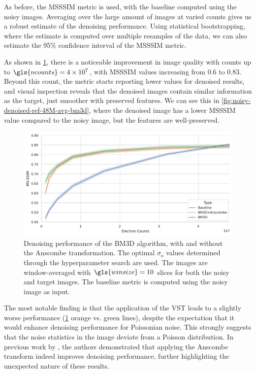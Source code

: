 As before, the \gls{MSSSIM} metric is used, with the baseline computed using the noisy images. Averaging over the large amount of images at varied counts gives us a robust estimate of the denoising performance. Using statistical bootstrapping, where the estimate is computed over multiple resamples of the data, we can also estimate the \num{95}\% confidence interval of the \gls{MSSSIM} metric.

As shown in \cref{fig:bm3d-msssim}, there is a noticeable improvement in image quality with counts up to $\gls{ncounts}=\num{4e7}$, with \gls{MSSSIM} values increasing from \num{0.6} to \num{0.83}. Beyond this count, the metric starts reporting lower values for denoised results, and visual inspection reveals that the denoised images contain similar information as the target, just smoother with preserved features. We can see this in \cref{fig:noisy-denoised-ref-48M-avg-bm3d}, where the denoised image has a lower \gls{MSSSIM} value compared to the noisy image, but the features are well-preserved.

\begin{figure}
    \centering
    \includegraphics[width=1\linewidth]{images/bm3d_msssim.pdf}
    \caption{Denoising performance of the \gls{BM3D} algorithm, with and without the Anscombe transformation. The optimal $\sigma_{\text{o}}$ values determined through the hyperparameter search are used. The images are window-averaged with $\gls{winsize}=10$ slices for both the noisy and target images. The baseline metric is computed using the noisy image as input.}
    \label{fig:bm3d-msssim}
\end{figure}


The most notable finding is that the application of the \gls{VST} leads to a slightly worse performance (\cref{fig:bm3d-msssim} orange vs. green lines), despite the expectation that it would enhance denoising performance for Poissonian noise. This strongly suggests that the noise statistics in the image deviate from a Poisson distribution. In previous work by \citeauthor{makitaloOptimalInversionAnscombe2011}, the authors demonstrated that applying the Anscombe transform indeed improves denoising performance, further highlighting the unexpected nature of these results.
